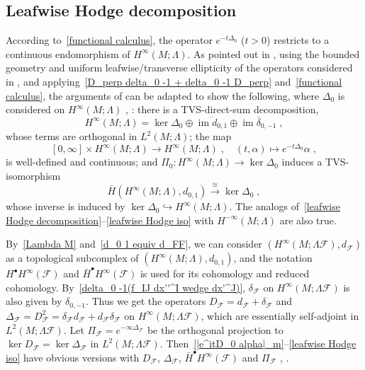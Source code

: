 \documentclass{memo-l}
\theoremstyle{plain}
\theoremstyle{definition}
\theoremstyle{remark}
\newcommand{\FF}{\mathcal{F}}
\newcommand{\im}{\operatorname{im}}
\numberwithin{section}{chapter}
\numberwithin{equation}{section}%
\begin{document}
\subsection{Leafwise Hodge decomposition}\label{ss: Leafwise Hodge}

According to~\eqref{functional calculus}, the operator $e^{-t\Delta_0}$ ($t>0$) restricts to a continuous endomorphism of $H^\infty(M;\Lambda)$. As pointed out in \cite{Sanguiao2008}, using the bounded geometry and uniform leafwise/transverse ellipticity of the operators considered in , and applying~\eqref{D_perp delta_0 -1 + delta_0 -1 D_perp} and~\eqref{functional calculus}, the arguments of \cite{AlvKordy2001} can be adapted to show the following, where $\Delta_0$ is considered on $H^\infty(M;\Lambda)$ \cite{Sanguiao2008}, \cite[Theorem~7.3 and Corollary~7.4]{AlvKordyLeichtnam2020}: there is a TVS-direct-sum decomposition, 
\begin{equation}\label{leafwise Hodge decomposition}
H^\infty(M;\Lambda)=\ker\Delta_0\oplus\overline{\im d_{0,1}}\oplus\overline{\im\delta_{0,-1}}\;,
\end{equation}
whose terms are orthogonal in $L^2(M;\Lambda)$; the map
\begin{equation}\label{leafwise heat flow}
[0,\infty]\times H^\infty(M;\Lambda)\to H^\infty(M;\Lambda)\;,\quad(t,\alpha)\mapsto e^{-t\Delta_0}\alpha\;,
\end{equation}
is well-defined and continuous; and $\Pi_0:H^\infty(M;\Lambda)\to\ker\Delta_0$ induces a TVS-isomorphism
\begin{equation}\label{leafwise Hodge iso}
\bar H(H^\infty(M;\Lambda),d_{0,1}) \xrightarrow{\cong} \ker\Delta_0\;,
\end{equation}
whose inverse is induced by $\ker\Delta_0\hookrightarrow H^\infty(M;\Lambda)$. The analogs of~\eqref{leafwise Hodge decomposition}--\eqref{leafwise Hodge iso} with $H^{-\infty}(M;\Lambda)$ are also true.

By~\eqref{Lambda M} and~\eqref{d_0 1 equiv d_FF}, we can consider $(H^\infty(M;\Lambda\FF),d_\FF)$ as a topological subcomplex of $(H^\infty(M;\Lambda),d_{0,1})$, and the notation $H^\bullet H^\infty(\FF)$ and $\bar H^\bullet H^\infty(\FF)$ is used for its cohomology and reduced cohomology. By~\eqref{delta_0 -1(f_IJ dx''^I wedge dx'^J)}, $\delta_\FF$ on $H^\infty(M;\Lambda\FF)$ is also given by $\delta_{0,-1}$. Thus we get the operators $D_\FF=d_\FF+\delta_\FF$ and $\Delta_\FF=D_\FF^2=\delta_\FF d_\FF+d_\FF\delta_\FF$ on $H^\infty(M;\Lambda\FF)$, which are essentially self-adjoint in $L^2(M;\Lambda\FF)$. Let $\Pi_\FF=e^{-\infty\Delta_\FF}$ be the orthogonal projection to $\ker D_\FF=\ker\Delta_\FF$ in $L^2(M;\Lambda\FF)$. Then~\eqref{|e^itD_0 alpha|_m}--\eqref{leafwise Hodge iso} have obvious versions with $D_\FF$, $\Delta_\FF$, $\bar H^\bullet H^\infty(\FF)$ and $\Pi_\FF$ \cite{Sanguiao2008}, \cite[Section~7]{AlvKordyLeichtnam2020}.
\end{document}

